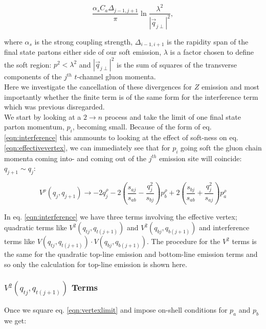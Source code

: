		\begin{equation}
			\frac{\alpha_s C_a \Delta_{j-1, j+1}}{\pi}\ln{\frac{\lambda^2}{|\vec{q}_{j\perp}|^2}},
		\end{equation}

		where $\alpha_s$ is the strong coupling strength, $\Delta_{i-1, i+1}$
		is the rapidity span of the final state partons either side of our soft emission, $\lambda$ is a
		factor chosen to define the soft region: $p^2 < \lambda^2$ and $|\vec{q}_{j\perp}|^2$ is the sum of
		squares of the transverse components of the $j^{th}$ $t$-channel gluon momenta.\\Here we investigate
		the cancellation of these divergences for $Z$ emission and most importantly whether the finite term
		is of the same form for the interference term which was previous disregarded.\\We start by looking
		at a $2\rightarrow n$ process and take the limit of one final state parton momentum, $p_i$, becoming
		small.  Because of the form of eq. \eqref{eqn:interference} this ammounts to looking at the
		effect of soft-ness on eq. \eqref{eqn:effectivevertex}, we can immediately see that for $p_i$
		going soft the gluon chain momenta coming into- and coming out of the $j^{th}$ emission site will
		coincide: $q_{j+1}\sim q_j$:

		\begin{equation}
			V^\rho(q_j, q_{j+1}) \rightarrow -2q_j^\rho - 2\left(\frac{s_{aj}}{s_{ab}} -
				\frac{q^2_{j}}{s_{bj}}\right)p_b^\rho + 2\left(\frac{s_{bj}}{s_{ab}} +
				\frac{q_j^2}{s_{aj}}\right)p_a^\rho
				\label{eqn:vertexlimit}
		\end{equation}

		In eq. \eqref{eqn:interference} we have three terms involving the effective vertex;
		quadratic terms like $V^2(q_{tj}, q_{t(j+1)})$ and $V^2(q_{bj}, q_{b(j+1)})$ and interference terms like
		$V(q_{tj}, q_{t(j+1)})\cdot V(q_{bj}, q_{b(j+1)})$.  The procedure for the $V^2$ terms is the same for
		the quadratic top-line emission and bottom-line emission terms and so only the calculation for top-line
		emission is shown here.

		\subsubsection{$V^2(q_{tj}, q_{t(j+1)})$ Terms}

			Once we square eq. \eqref{eqn:vertexlimit} and impose on-shell conditions for $p_a$ and $p_b$ we get:

